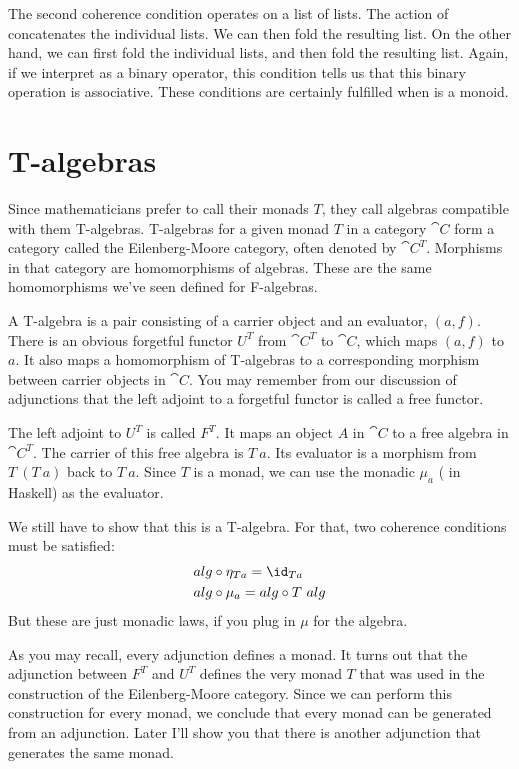 The second coherence condition operates on a list of lists. The action
of  concatenates the individual lists. We can then fold the
resulting list. On the other hand, we can first fold the individual
lists, and then fold the resulting list. Again, if we interpret
 as a binary operator, this condition tells us that this
binary operation is associative. These conditions are certainly
fulfilled when  is a monoid.

\section{T-algebras}

Since mathematicians prefer to call their monads $T$, they call
algebras compatible with them T-algebras. T-algebras for a given monad $T$
in a category $\cat{C}$ form a category called the Eilenberg-Moore
category, often denoted by $\cat{C}^T$. Morphisms in that
category are homomorphisms of algebras. These are the same homomorphisms
we've seen defined for F-algebras.

A T-algebra is a pair consisting of a carrier object and an evaluator,
$(a, f)$. There is an obvious forgetful functor $U^T$ from
$\cat{C}^T$ to $\cat{C}$, which maps $(a, f)$ to $a$. It
also maps a homomorphism of T-algebras to a corresponding morphism
between carrier objects in $\cat{C}$. You may remember from our discussion of
adjunctions that the left adjoint to a forgetful functor is called a
free functor.

The left adjoint to $U^T$ is called $F^T$. It maps an object
$A$ in $\cat{C}$ to a free algebra in $\cat{C}^T$. The carrier
of this free algebra is $T\ a$. Its evaluator is a morphism from
$T\ (T\ a)$ back to $T\ a$. Since $T$ is a monad,
we can use the monadic $\mu_a$ ( in Haskell) as the
evaluator.

We still have to show that this is a T-algebra. For that, two coherence
conditions must be satisfied:
\begin{align*}
alg &\circ \eta_{Ta} = \id_{Ta} \\
alg &\circ \mu_a = alg \circ T\ alg
\end{align*}
But these are just monadic laws, if you plug in $\mu$ for the
algebra.

As you may recall, every adjunction defines a monad. It turns out that
the adjunction between $F^T$ and $U^T$
defines the very monad $T$ that was used in the construction of
the Eilenberg-Moore category. Since we can perform this construction for
every monad, we conclude that every monad can be generated from an
adjunction. Later I'll show you that there is another adjunction that
generates the same monad.


